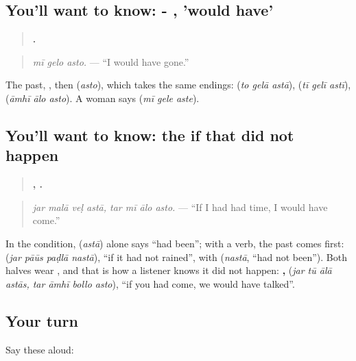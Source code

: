 \subsection*{You'll want to know: - , 'would have'}
\begin{quote}
\textbf{  .}
\end{quote}

\begin{quote}
\emph{mī gelo asto.} — \textquotedblleft{}I would have gone.\textquotedblright{}
\end{quote}

The past, \textbf{}, then \textbf{} (\emph{asto}), which takes the same endings: \textbf{  } (\emph{to gelā astā}), \textbf{  } (\emph{tī gelī astī}), \textbf{  } (\emph{āmhī ālo asto}). A woman says \textbf{  } (\emph{mī gele aste}).

\subsection*{You'll want to know: the if that did not happen}
\begin{quote}
\textbf{   ,    .}
\end{quote}

\begin{quote}
\emph{jar malā veḷ astā, tar mī ālo asto.} — \textquotedblleft{}If I had had time, I would have come.\textquotedblright{}
\end{quote}

In the condition, \textbf{} (\emph{astā}) alone says \textquotedblleft{}had been\textquotedblright{}; with a verb, the past comes first: \textbf{   } (\emph{jar pāūs paḍlā nastā}), \textquotedblleft{}if it had not rained\textquotedblright{}, with \textbf{} (\emph{nastā}, \textquotedblleft{}had not been\textquotedblright{}). Both halves wear \textbf{}, and that is how a listener knows it did not happen: \textbf{   ,    } (\emph{jar tū ālā astās, tar āmhī bollo asto}), \textquotedblleft{}if you had come, we would have talked\textquotedblright{}.

\subsection*{Your turn}
Say these aloud:

